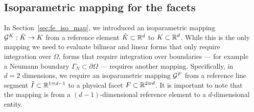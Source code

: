 \subsection{Isoparametric mapping for the facets}
In Section~\ref{sec:fe_iso_map}, we introduced an isoparametric mapping $\mathcal{G}^K: \tilde K \to K$ from a reference element $\tilde K \subset \mathbb{R}^d$ to $K \subset \mathbb{R}^d$.  While this is the only mapping we need to evaluate bilinear and linear forms that only require integration over $\Omega$, forms that require integration over boundaries --- for example a Neumann boundary $\Gamma_N \subset \partial \Omega$ --- requires another mapping.  Specifically, in $d=2$ dimensions, we require an isoparametric mapping $\mathcal{G}^F$ from a reference line segment $\tilde I \subset \mathbb{R}^{1 \equiv d-1}$ to a physical facet $F \subset \mathbb{R}^{2 \equiv d}$.  It is important to note that the mapping is from a $(d-1)$-dimensional reference element to a $d$-dimensional entity.

